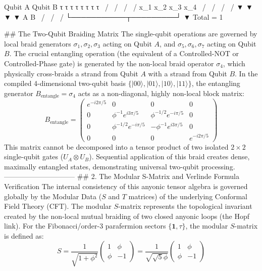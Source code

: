         Qubit A                       Qubit B
     τ    τ    τ    τ              τ    τ    τ    τ
      \  /      \  /                \  /      \  /
       x_1       x_2                 x_3       x_4
        \       /                     \       /
         \     /                       \     /
          ▼   ▼                         ▼   ▼
            A                             B
             \                           /
              \                         /
               \                       /
                └───────────┬─────────┘
                            ▼
                       Total = 1

## The Two-Qubit Braiding Matrix
The single-qubit operations are governed by local braid generators $\sigma_1, \sigma_2, \sigma_3$ acting on Qubit $A$, and $\sigma_5, \sigma_6, \sigma_7$ acting on Qubit $B$. The crucial entangling operation (the equivalent of a Controlled-NOT or Controlled-Phase gate) is generated by the non-local braid operator $\sigma_4$, which physically cross-braids a strand from Qubit $A$ with a strand from Qubit $B$.
In the compiled 4-dimensional two-qubit basis $\{\vert{}00\rangle, \vert{}01\rangle, \vert{}10\rangle, \vert{}11\rangle\}$, the entangling generator $B_{\text{entangle}} = \sigma_4$ acts as a non-diagonal, highly non-local block matrix:
$$B_{\text{entangle}} = \begin{pmatrix} e^{-i2\pi/5} & 0 & 0 & 0 \\ 0 & \phi^{-1}e^{i3\pi/5} & \phi^{-1/2}e^{-i\pi/5} & 0 \\ 0 & \phi^{-1/2}e^{-i\pi/5} & -\phi^{-1}e^{i3\pi/5} & 0 \\ 0 & 0 & 0 & e^{-i2\pi/5} \end{pmatrix}$$ 
This matrix cannot be decomposed into a tensor product of two isolated $2 \times 2$ single-qubit gates ($U_A \otimes U_B$). Sequential application of this braid creates dense, maximally entangled states, demonstrating universal two-qubit processing.
------------------------------
## 2. The Modular S-Matrix and Verlinde Formula Verification
The internal consistency of this anyonic tensor algebra is governed globally by the Modular Data ($S$ and $T$ matrices) of the underlying Conformal Field Theory (CFT). The modular $S$-matrix represents the topological invariant created by the non-local mutual braiding of two closed anyonic loops (the Hopf link).
For the Fibonacci/order-3 parafermion sectors $\{\mathbf{1}, \tau\}$, the modular $S$-matrix is defined as:
$$S = \frac{1}{\sqrt{1 + \phi^2}} \begin{pmatrix} 1 & \phi \\ \phi & -1 \end{pmatrix} = \frac{1}{\sqrt{\sqrt{5}\phi}} \begin{pmatrix} 1 & \phi \\ \phi & -1 \end{pmatrix}$$ 
